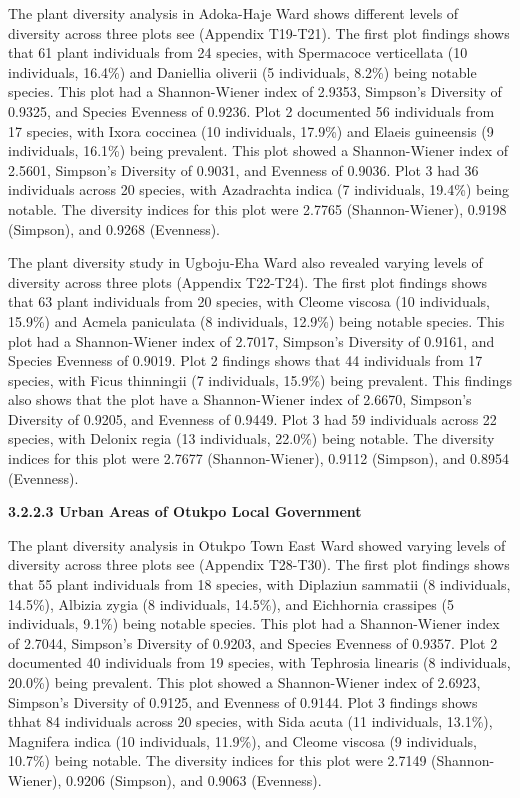 The plant diversity analysis in Adoka-Haje Ward shows different levels of diversity across three plots see (Appendix T19-T21). The first plot findings shows that 61 plant individuals from 24 species, with Spermacoce verticellata (10 individuals, 16.4\%) and Daniellia oliverii (5 individuals, 8.2\%) being notable species. This plot had a Shannon-Wiener index of 2.9353, Simpson's Diversity of 0.9325, and Species Evenness of 0.9236. Plot 2 documented 56 individuals from 17 species, with Ixora coccinea (10 individuals, 17.9\%) and Elaeis guineensis (9 individuals, 16.1\%) being prevalent. This plot showed a Shannon-Wiener index of 2.5601, Simpson's Diversity of 0.9031, and Evenness of 0.9036. Plot 3 had 36 individuals across 20 species, with Azadrachta indica (7 individuals, 19.4\%) being notable. The diversity indices for this plot were 2.7765 (Shannon-Wiener), 0.9198 (Simpson), and 0.9268 (Evenness).

The plant diversity study in Ugboju-Eha Ward also revealed varying levels of diversity across three plots (Appendix T22-T24). The first plot findings shows that 63 plant individuals from 20 species, with Cleome viscosa (10 individuals, 15.9\%) and Acmela paniculata (8 individuals, 12.9\%) being notable species. This plot had a Shannon-Wiener index of 2.7017, Simpson's Diversity of 0.9161, and Species Evenness of 0.9019. Plot 2 findings shows that 44 individuals from 17 species, with Ficus thinningii (7 individuals, 15.9\%) being prevalent. This findings also shows that the plot have a Shannon-Wiener index of 2.6670, Simpson's Diversity of 0.9205, and Evenness of 0.9449. Plot 3 had 59 individuals across 22 species, with Delonix regia (13 individuals, 22.0\%) being notable. The diversity indices for this plot were 2.7677 (Shannon-Wiener), 0.9112 (Simpson), and 0.8954 (Evenness).

{}\textbf{3.2.2.3 Urban Areas of Otukpo Local Government}

The plant diversity analysis in Otukpo Town East Ward showed varying levels of diversity across three plots see (Appendix T28-T30). The first plot findings shows that 55 plant individuals from 18 species, with Diplaziun sammatii (8 individuals, 14.5\%), Albizia zygia (8 individuals, 14.5\%), and Eichhornia crassipes (5 individuals, 9.1\%) being notable species. This plot had a Shannon-Wiener index of 2.7044, Simpson's Diversity of 0.9203, and Species Evenness of 0.9357. Plot 2 documented 40 individuals from 19 species, with Tephrosia linearis (8 individuals, 20.0\%) being prevalent. This plot showed a Shannon-Wiener index of 2.6923, Simpson's Diversity of 0.9125, and Evenness of 0.9144. Plot 3 findings shows thhat 84 individuals across 20 species, with Sida acuta (11 individuals, 13.1\%), Magnifera indica (10 individuals, 11.9\%), and Cleome viscosa (9 individuals, 10.7\%) being notable. The diversity indices for this plot were 2.7149 (Shannon-Wiener), 0.9206 (Simpson), and 0.9063 (Evenness).

